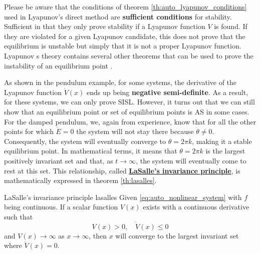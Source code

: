 Please be aware that the conditions of theorem \ref{th:auto_lyapunov_conditions} used in Lyapunov's direct method are \textbf{sufficient conditions} for stability. Sufficient in that they only prove stability if a Lyapunov function $V$ is found. If they are violated for a given Lyapunov candidate, this does not prove that the equilibrium is unstable but simply that it is not a proper Lyapunov function. Lyapunov s theory contains several other theorems that can be used to prove the instability of an equilibrium point \cite{khalilNonlinearSystems2002}.

As shown in the pendulum example, for some systems, the derivative of the Lyapunov function $\dot{V}\left(x \right)$ ends up being \textbf{negative semi-definite}. As a result, for these systems, we can only prove SISL. However, it turns out that we can still show that an equilibrium point or set of equilibrium points is AS in some cases. For the damped pendulum, we, again from experience, know that for all the other points for which $\dot{E} = 0$ the system will not stay there because $\ddot{ \theta }\neq 0$. Consequently, the system will eventually converge to $\theta = 2 \pi k$, making it a stable equilibrium point. In mathematical terms, it means that $\theta = 2 \pi k$ is the largest positively invariant set and that, as $t \rightarrow\infty$, the system will eventually come to rest at this set. This relationship, called \textbf{\hyperref[th:lasalles]{LaSalle's invariance principle}}, is mathematically expressed in theorem \ref{th:lasalles}.

\begin{theorem}[list text=LaSalle's invariance principle,after pre=\footnotetext{Theorem 4.4 of \cite{khalilNonlinearSystems2002} was reworded to improve readability.}]{LaSalle's invariance principle \cite{khalilNonlinearSystems2002}\footnotemark}{lasalles}
  Given \eqref{eq:auto_nonlinear_system} with $f$ being continuous. If a scalar function $V \left( x \right)$ exists with a continuous derivative such that
  \begin{equation}
    V \left( x \right)> 0, \quad \dot{ V }\left( x \right) \le 0
  \end{equation}
  and $V \left( x \right)\rightarrow\infty$ as $x \rightarrow \infty$, then $x$ will converge to the largest invariant set where $\dot{V}\left( x \right) = 0$.
\end{theorem}

